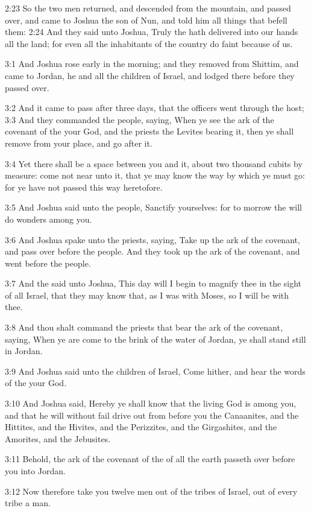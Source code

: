 2:23 So the two men returned, and descended from the mountain, and passed over, and came to Joshua the son of Nun, and told him all things that befell them: 2:24 And they said unto Joshua, Truly the \LORD hath delivered into our hands all the land; for even all the inhabitants of the country do faint because of us.

3:1 And Joshua rose early in the morning; and they removed from Shittim, and came to Jordan, he and all the children of Israel, and lodged there before they passed over.

3:2 And it came to pass after three days, that the officers went through the host; 3:3 And they commanded the people, saying, When ye see the ark of the covenant of the \LORD your God, and the priests the Levites bearing it, then ye shall remove from your place, and go after it.

3:4 Yet there shall be a space between you and it, about two thousand cubits by measure: come not near unto it, that ye may know the way by which ye must go: for ye have not passed this way heretofore.

3:5 And Joshua said unto the people, Sanctify yourselves: for to morrow the \LORD will do wonders among you.

3:6 And Joshua spake unto the priests, saying, Take up the ark of the covenant, and pass over before the people. And they took up the ark of the covenant, and went before the people.

3:7 And the \LORD said unto Joshua, This day will I begin to magnify thee in the sight of all Israel, that they may know that, as I was with Moses, so I will be with thee.

3:8 And thou shalt command the priests that bear the ark of the covenant, saying, When ye are come to the brink of the water of Jordan, ye shall stand still in Jordan.

3:9 And Joshua said unto the children of Israel, Come hither, and hear the words of the \LORD your God.

3:10 And Joshua said, Hereby ye shall know that the living God is among you, and that he will without fail drive out from before you the Canaanites, and the Hittites, and the Hivites, and the Perizzites, and the Girgashites, and the Amorites, and the Jebusites.

3:11 Behold, the ark of the covenant of the \LORD of all the earth passeth over before you into Jordan.

3:12 Now therefore take you twelve men out of the tribes of Israel, out of every tribe a man.

